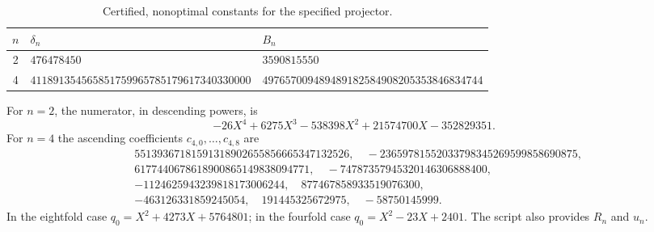 \documentclass[11pt,a4paper]{article}
\theoremstyle{definition}\newtheorem{definition}[theorem]{Definition}
\theoremstyle{remark}\newtheorem{remark}[theorem]{Remark}
\begin{document}
\begin{table}[htbp]\centering\small
\begin{tabular}{c p{63mm} p{63mm}}
\toprule $n$ & $\delta_n$ & $B_n$\\\midrule
2 & $476478450$ & $3590815550$\\[4pt]
4 & $411891354565851759965785179617340330000$ & $497657009489489182584908205353846834744$\\
\bottomrule
\end{tabular}
\caption{Certified, nonoptimal constants for the specified projector.}\label{tab:projectors}
\end{table}

For $n=2$, the numerator, in descending powers, is
\[
 -26X^4+6275X^3-538398X^2+21574700X-352829351.
\]
For $n=4$ the ascending coefficients $c_{4,0},\ldots,c_{4,8}$ are
\begin{align*}
&55139367181591318902655856665347132526,\quad
-23659781552033798345269599858690875,\\
&6177440678618900865149838094771,\quad
-74787357945320146306888400,\\
&-1124625943239818173006244,\quad877467858933519076300,\\
&-463126331859245054,\quad191445325672975,\quad-58750145999.
\end{align*}
In the eightfold case $q_0=X^2+4273X+5764801$; in the fourfold case $q_0=X^2-23X+2401$. The script also provides $R_n$ and $u_n$.
\end{document}
